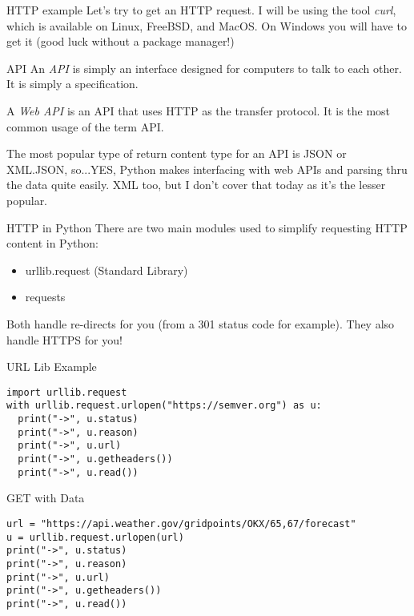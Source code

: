 \begin{frame}{HTTP example}
  Let's try to get an HTTP request. I will be using the tool \textit{curl}, which is available on Linux, FreeBSD, and MacOS. On Windows you will have to get it (good luck without a package manager!)
\end{frame}

\begin{frame}{API}
  An \textit{API} is simply an interface designed for computers to talk to each other. It is simply a specification.

  A \textit{Web API} is an API that uses HTTP as the transfer protocol. It is the most common usage of the term API.

  The most popular type of return content type for an API is JSON or XML.\pause JSON, so...\pause YES, Python makes interfacing with web APIs and parsing thru the data quite easily. XML too, but I don't cover that today as it's the lesser popular.
\end{frame}

\begin{frame}{HTTP in Python}
  There are two main modules used to simplify requesting HTTP content in Python:
  \begin{itemize}
    \item urllib.request (Standard Library)
    \item requests
  \end{itemize}

  Both handle re-directs for you (from a 301 status code for example). They also handle HTTPS for you!
\end{frame}

\begin{frame}[containsverbatim]{URL Lib Example}
\begin{verbatim}
import urllib.request
with urllib.request.urlopen("https://semver.org") as u:
  print("->", u.status)
  print("->", u.reason)
  print("->", u.url)
  print("->", u.getheaders())
  print("->", u.read())
\end{verbatim}
\end{frame}

\begin{frame}[containsverbatim]{GET with Data}
\begin{verbatim}
url = "https://api.weather.gov/gridpoints/OKX/65,67/forecast"
u = urllib.request.urlopen(url)
print("->", u.status)
print("->", u.reason)
print("->", u.url)
print("->", u.getheaders())
print("->", u.read())
\end{verbatim}
\end{frame}

